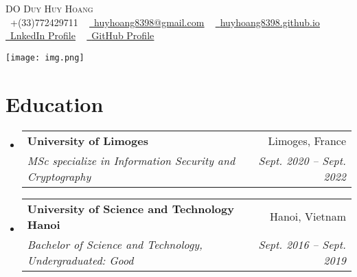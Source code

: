 \documentclass[letterpaper,11pt]{article}
\makeatletter
\newcommand{\resumeSubheading}[4]{
  \vspace{-2pt}\item
  \begin{tabular*}{0.97\textwidth}[t]{l@{\extracolsep{\fill}}r}
      \textbf{#1} & #2 \\
      \textit{\small#3} & \textit{\small #4} \\
    \end{tabular*}\vspace{-7pt}
}
\newcommand{\resumeSubHeadingListStart}{\begin{itemize}[leftmargin=0.15in, label={}]}
\newcommand{\resumeSubHeadingListEnd}{\end{itemize}}
\makeatother
\begin{document}



\begin{minipage}[t]{0.7\textwidth}
  \vspace{2pt}
  \begin{center}
    {\Huge \scshape DO Duy Huy Hoang}
    \\
    \small \raisebox{-0.1\height}\faPhone\ +(33)772429711
    ~ \href{mailto:example@examaple.com}{\raisebox{-0.2\height}\faEnvelope\  \underline{huyhoang8398@gmail.com}}
    ~ \href{https://huyhoang8398.github.io/}{\raisebox{-0.2\height}\faGlobe\ \underline{huyhoang8398.github.io}}  \vspace{2pt} \\
    \href{https://linkedin.com/in/dohoang}{\raisebox{-0.2\height}\faLinkedin\ \underline{LnkedIn Profile}}
    ~ \href{https://github.com/huyhoang8398/}{\raisebox{-0.2\height}\faGithub\ \underline{GitHub Profile}}
  \end{center}

\end{minipage}%
\begin{minipage}[t]{0.3\textwidth}
  \vspace{0pt} %
  \raggedleft %
  \texttt{[image: img.png]}
\end{minipage}


\section{Education}
  \resumeSubHeadingListStart
    \resumeSubheading
      {University of Limoges}{Limoges, France}
      {MSc specialize in Information Security and Cryptography}{Sept. 2020 -- Sept. 2022}
    \resumeSubheading
      {University of Science and Technology Hanoi}{Hanoi, Vietnam}
      {Bachelor of Science and Technology, Undergraduated: Good}{Sept. 2016 -- Sept. 2019}
  \resumeSubHeadingListEnd
\end{document}
